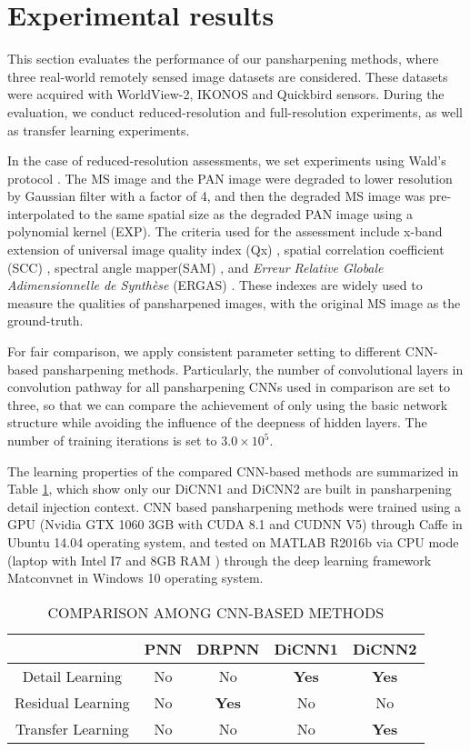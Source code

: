 \documentclass[journal]{IEEEtran}
\begin{document}
\section{Experimental results}\label{sec:ExperiResults}
This section evaluates the performance of our pansharpening methods, where three real-world remotely sensed image datasets are considered. These datasets were acquired with WorldView-2, IKONOS and Quickbird sensors. During the evaluation, we conduct reduced-resolution and full-resolution experiments, as well as transfer learning experiments.

In the case of reduced-resolution assessments, we set experiments using Wald's protocol \cite{Wald:Wald1997}. The MS image and the PAN image were degraded to lower resolution by Gaussian filter with a factor of 4\cite{Alparone2006MTF}, and then the degraded MS image was pre-interpolated to the same spatial size as the degraded PAN image using a polynomial kernel (EXP)\cite{EXP:Aiazzi2002}.
The criteria used for the assessment include x-band extension of universal image quality index (Qx) \cite{Alparone2004A}, spatial correlation coefficient (SCC) \cite{J1998A}, spectral angle mapper(SAM) \cite{Yuhas1992Descrimination}, and \emph{Erreur Relative Globale Adimensionnelle de Synth\`{e}se} (ERGAS) \cite{Wald2002Data}. These indexes are widely used to measure the qualities of pansharpened images, with the original MS image as the ground-truth.

For fair comparison, we apply consistent parameter setting to different CNN-based pansharpening methods.
Particularly, the number of convolutional layers in convolution pathway for all pansharpening CNNs used in comparison are set to three, so that we can compare the achievement of only using the basic network structure while avoiding the influence of the deepness of hidden layers. The number of training iterations is set to  $3.0\times10^5$.

The learning properties of the compared CNN-based methods are summarized in Table \ref{table:comparison}, which show only our DiCNN1 and DiCNN2 are built in pansharpening detail injection context. CNN based pansharpening methods were trained using a GPU (Nvidia GTX 1060 3GB with CUDA 8.1 and CUDNN V5) through Caffe \cite{Caffe:Jia2014} in Ubuntu 14.04 operating system, and tested on MATLAB R2016b via CPU mode (laptop with Intel I7 and 8GB RAM ) through the deep learning framework Matconvnet \cite{MatconvNet:Vedaldi2015} in Windows 10 operating system.

\begin{table}[h]
\small
\caption{COMPARISON AMONG CNN-BASED METHODS}
\centering
\begin{tabular}{c|cccc}
\hline
{}&PNN&DRPNN&DiCNN1&DiCNN2\\
\hline
Detail Learning& No &No&\textbf{Yes} &\textbf{Yes}\\
\hline
Residual Learning& No &\textbf{Yes} &No &No \\
\hline
Transfer Learning & No &No&No &\textbf{Yes}\\
\hline
\end{tabular}
\label{table:comparison}
\end{table}
\end{document}
